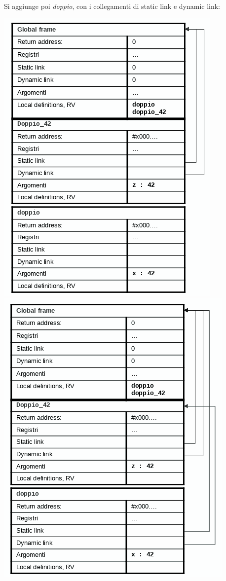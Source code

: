 \documentclass[a4paper,12pt, oneside]{book}
\begin{document}
\newpage
Si aggiunge poi \textit{doppio}, con i collegamenti di static link e dynamic link:
\begin{center}
\includegraphics[scale=0.4]{img/sta4.png}
\quad 
\includegraphics[scale=0.4]{img/sta5.png}
\end{center}
\end{document}
